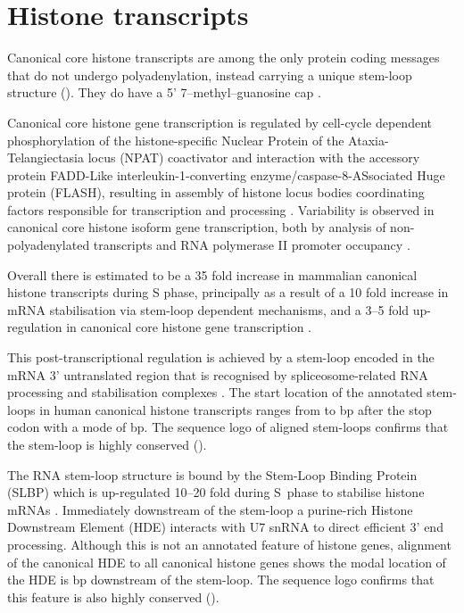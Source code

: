 \section{Histone transcripts}

  Canonical core histone transcripts are among the only protein coding messages
  that do not undergo polyadenylation,
  instead carrying a unique stem-loop structure ().
  They do have a 5' 7--methyl--guanosine cap \citep{MarzluffNatRevGen2008}.

  Canonical core histone gene transcription is regulated
  by cell-cycle dependent phosphorylation of the histone-specific
  Nuclear Protein of the Ataxia-Telangiectasia locus (NPAT) coactivator
  and interaction with the accessory protein
  FADD-Like interleukin-1\textbeta{}-converting
  enzyme/caspase-8-ASsociated Huge protein (FLASH),
  resulting in assembly of histone locus bodies
  coordinating factors responsible for transcription and processing
  \citep{MarzluffNatRevGen2008,RattrayMueller2012,Hoefig2014}.
  Variability is observed in canonical core histone isoform gene transcription,
  both by analysis of non-polyadenylated transcripts \citep{YangGenomeBiol2011}
  and RNA polymerase II promoter occupancy \citep{Ederveen2011}.

  Overall there is estimated to be a 35 fold increase in mammalian
  canonical histone transcripts during S phase,
  principally as a result of a 10 fold increase in mRNA stabilisation
  via stem-loop dependent mechanisms,
  and a 3--5 fold up-regulation in canonical core histone gene transcription \citep{HarrisMCB1991}.

  This post-transcriptional regulation is achieved by
  a stem-loop encoded in the mRNA 3' untranslated region
  that is recognised by spliceosome-related RNA
  processing and stabilisation complexes \citep{stem-loop-structure}.
  The start location of the annotated stem-loops in human canonical histone transcripts
  ranges from \StemLoopStartMin{} to \StemLoopStartMax{} bp after the stop codon
  with a mode of \StemLoopStartMode{} bp.
  The sequence logo of aligned stem-loops confirms that the stem-loop is
  highly conserved ().

  The RNA stem-loop structure is bound by the Stem-Loop Binding Protein (SLBP)
  which is up-regulated 10--20 fold during S~phase to stabilise
  histone mRNAs \citep{SLBP-regulation}.
  Immediately downstream of the stem-loop a purine-rich Histone Downstream Element (HDE)
  interacts with U7 snRNA to direct efficient 3' end processing.
  Although this is not an annotated feature of histone genes,
  alignment of the canonical HDE \citep{HDE-sequence} to all canonical histone genes
  shows the modal location of the HDE is
  \HDEsDistanceFromStemLoopMode{} bp downstream of the stem-loop.
  The sequence logo confirms that this feature is also highly conserved ().

